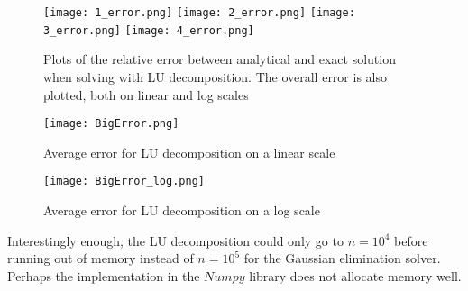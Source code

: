 \documentclass[12pt]{article}
\begin{document}
\begin{figure}[H]
\centering
\graphicspath{{~/GitHub/sayboltm/PHY480/Project1/Report/Precision/LU/} {c:/Users/charl/Documents/Precision/LU/}{C:/Users/Mike/Documents/GitHub/sayboltm/PHY480/Project1/Report/Precision/LU/}}
\texttt{[image: 1\_error.png]}
\texttt{[image: 2\_error.png]}
\texttt{[image: 3\_error.png]}
\texttt{[image: 4\_error.png]}\\
\centering
\caption{ Plots of the relative error between analytical and exact solution when solving with LU decomposition.	The overall error is also plotted, both on linear and log scales}
\end{figure}

\begin{figure}[H]
\centering
\graphicspath{{~/GitHub/sayboltm/PHY480/Project1/Report/Precision/LU/} {c:/Users/charl/Documents/Precision/LU/}{C:/Users/Mike/Documents/GitHub/sayboltm/PHY480/Project1/Report/Precision/LU/}}
\texttt{[image: BigError.png]}
\caption{Average error for LU decomposition on a linear scale}
\end{figure}

\begin{figure}[H]
\centering
\graphicspath{{~/GitHub/sayboltm/PHY480/Project1/Report/Precision/LU/} {c:/Users/charl/Documents/Precision/LU/}{C:/Users/Mike/Documents/GitHub/sayboltm/PHY480/Project1/Report/Precision/LU/}}
\texttt{[image: BigError\_log.png]}
\caption{Average error for LU decomposition on a log scale}
\end{figure}

Interestingly enough, the LU decomposition could only go to $n=10^4$ before running out of memory instead of $n=10^5$ for the Gaussian elimination solver. Perhaps the implementation in the $Numpy$ library does not allocate memory well.
\end{document}
